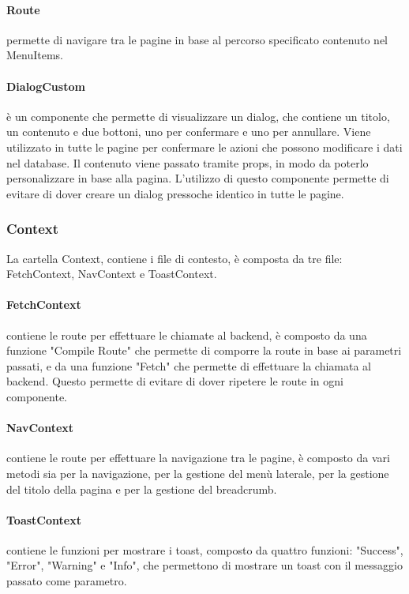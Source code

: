 \paragraph{Route} permette di navigare tra le pagine in base al percorso specificato contenuto nel MenuItems.\\
\paragraph{DialogCustom} è un componente che permette di visualizzare un dialog, che contiene un titolo, un contenuto e due bottoni, uno per confermare e uno per annullare. Viene utilizzato in tutte le pagine per confermare le azioni che possono modificare i dati nel database. Il contenuto viene passato tramite props, in modo da poterlo personalizzare in base alla pagina. L'utilizzo di questo componente permette di evitare di dover creare un dialog pressoche identico in tutte le pagine.\\

\subsubsection{Context}
La cartella Context, contiene i file di contesto, è composta da tre file: FetchContext, NavContext e ToastContext.

\paragraph{FetchContext} contiene le route per effettuare le chiamate al backend, è composto da una funzione "Compile Route" che permette di comporre la route in base ai parametri passati, e da una funzione "Fetch" che permette di effettuare la chiamata al backend. Questo permette di evitare di dover ripetere le route in ogni componente.\\

\paragraph{NavContext} contiene le route per effettuare la navigazione tra le pagine, è composto da vari metodi sia per la navigazione, per la gestione del menù laterale, per la gestione del titolo della pagina e per la gestione del breadcrumb. \\


\paragraph{ToastContext} contiene le funzioni per mostrare i toast, composto da quattro funzioni: "Success", "Error", "Warning" e "Info", che permettono di mostrare un toast con il messaggio passato come parametro.\\


